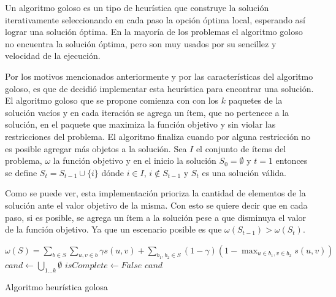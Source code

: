 Un algoritmo goloso es un tipo de heurística que construye la solución iterativamente seleccionando en cada paso la opción óptima local, esperando así lograr una solución óptima. En la mayoría de los problemas el algoritmo goloso no encuentra la solución óptima, pero son muy usados por su sencillez y velocidad de la ejecución.

Por los motivos mencionados anteriormente y por las características del algoritmo goloso, es que de decidió implementar esta heurística para encontrar una solución. El algoritmo goloso que se propone comienza con con los $k$ paquetes de la solución vacíos y en cada iteración se agrega un ítem, que no pertenece a la solución, en el paquete que maximiza la función objetivo y sin violar las restricciones del problema. El algoritmo finaliza cuando por alguna restricción no es posible agregar más objetos a la solución. Sea $I$ el conjunto de ítems del problema, $\omega$ la función objetivo y en el inicio la solución $S_0 = \emptyset$ y $t=1$ entonces se define $S_t = S_{t-1} \cup \{i\}$ dónde $i \in I$, $i \notin S_{t-1}$ y $S_t$ es una solución válida. 

Como se puede ver, esta implementación prioriza la cantidad de elementos de la solución ante el valor objetivo de la misma. Con esto se quiere decir que en cada paso, si es posible, se agrega un ítem a la solución pese a que disminuya el valor de la función objetivo. Ya que un escenario posible es que $\omega(S_{t-1}) > \omega(S_t)$.

\begin{center}
	\begin{algorithm}[H]
	\DontPrintSemicolon
	\SetAlgoLined
		$\omega(S) = \sum_{b \in S}{\sum_{u,v \in b}{\gamma s(u,v)}} + \sum_{b_1,b_2 \in S}{(1-\gamma) (1-\max_{u \in b_1, v \in b_2}{s(u,v)})}$\;
		$cand \leftarrow \bigcup_{1 \ldots k}\emptyset$\;
		$isComplete \leftarrow False$\;
		\Return $cand$\;
	\caption{Algoritmo heurística golosa}\label{alg:algHeuGol}
	\end{algorithm}
\end{center}

